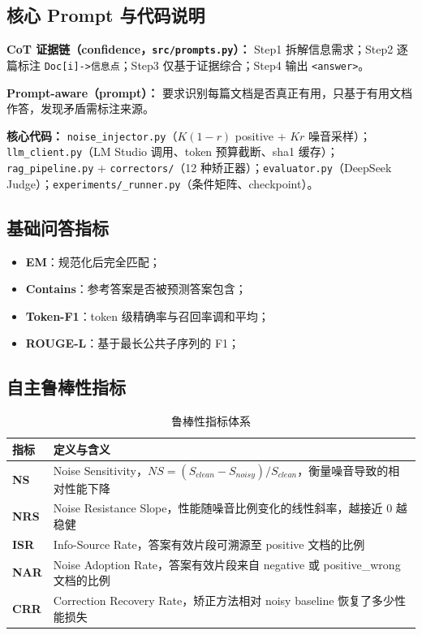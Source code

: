 \documentclass[UTF8,zihao=-4]{ctexart}
\newcommand{\metric}[1]{\textbf{\textcolor{sduBlue}{#1}}}
\begin{document}
\subsection{核心 Prompt 与代码说明}
\textbf{CoT 证据链（confidence，\texttt{src/prompts.py}）：} Step1 拆解信息需求；Step2 逐篇标注 \texttt{Doc[i]->信息点}；Step3 仅基于证据综合；Step4 输出 \texttt{<answer>}。

\textbf{Prompt-aware（prompt）：} 要求识别每篇文档是否真正有用，只基于有用文档作答，发现矛盾需标注来源。

\textbf{核心代码：} \texttt{noise\_injector.py}（$K(1-r)$ positive + $Kr$ 噪音采样）；\texttt{llm\_client.py}（LM Studio 调用、token 预算截断、sha1 缓存）；\texttt{rag\_pipeline.py} + \texttt{correctors/}（12 种矫正器）；\texttt{evaluator.py}（DeepSeek Judge）；\texttt{experiments/\_runner.py}（条件矩阵、checkpoint）。

\subsection{基础问答指标}

\begin{itemize}
  \item \metric{EM}：规范化后完全匹配；
  \item \metric{Contains}：参考答案是否被预测答案包含；
  \item \metric{Token-F1}：token 级精确率与召回率调和平均；
  \item \metric{ROUGE-L}：基于最长公共子序列的 F1；
\end{itemize}

\subsection{自主鲁棒性指标}

\begin{table}[H]
  \centering
  \caption{鲁棒性指标体系}
  \begin{tabularx}{\textwidth}{lY}
    \toprule
    指标 & 定义与含义 \\
    \midrule
    \metric{NS} & Noise Sensitivity，$NS=(S_{clean}-S_{noisy})/S_{clean}$，衡量噪音导致的相对性能下降 \\
    \metric{NRS} & Noise Resistance Slope，性能随噪音比例变化的线性斜率，越接近 0 越稳健 \\
    \metric{ISR} & Info-Source Rate，答案有效片段可溯源至 positive 文档的比例 \\
    \metric{NAR} & Noise Adoption Rate，答案有效片段来自 negative 或 positive\_wrong 文档的比例 \\
    \metric{CRR} & Correction Recovery Rate，矫正方法相对 noisy baseline 恢复了多少性能损失 \\
    \bottomrule
  \end{tabularx}
\end{table}
\end{document}
